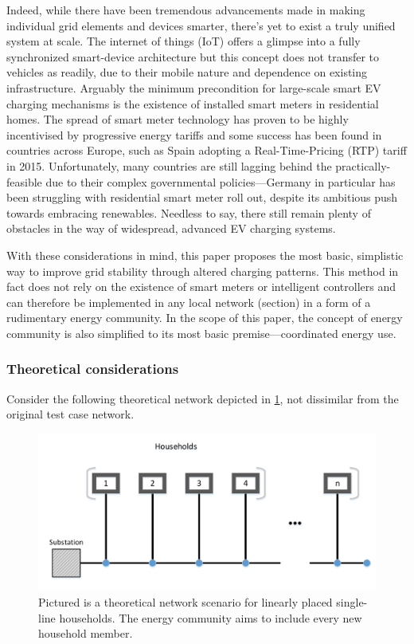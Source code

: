 \documentclass[a4paper,10pt]{report}
\begin{document}
Indeed, while there have been tremendous advancements made in making individual grid elements and devices smarter, there's yet to exist a truly unified system at scale. The internet of things (IoT) offers a glimpse into a fully synchronized smart-device architecture but this concept does not transfer to vehicles as readily, due to their mobile nature and dependence on existing infrastructure. Arguably the minimum precondition for large-scale smart EV charging mechanisms is the existence of installed smart meters in residential homes. The spread of smart meter technology has proven to be highly incentivised by progressive energy tariffs and some success has been found in countries across Europe, such as Spain adopting a Real-Time-Pricing (RTP) tariff in 2015. Unfortunately, many countries are still lagging behind the practically-feasible due to their complex governmental policies---Germany in particular has been struggling with residential smart meter roll out, despite its ambitious push towards embracing renewables. Needless to say, there still remain plenty of obstacles in the way of widespread, advanced EV charging systems.

With these considerations in mind, this paper proposes the most basic, simplistic way to improve grid stability through altered charging patterns. This method in fact does not rely on the existence of smart meters or intelligent controllers and can therefore be implemented in any local network (section) in a form of a rudimentary energy community. In the scope of this paper, the concept of energy community is also simplified to its most basic premise---coordinated energy use.

\subsubsection{Theoretical considerations}

Consider the following theoretical network depicted in \cref{comm_topology}, not dissimilar from the original test case network.

\begin{figure}[htpb]
	\centering
	\includegraphics[width=0.7\linewidth]{comm_topology}
	\caption{Pictured is a theoretical network scenario for linearly placed single-line households. The energy community aims to include every new household member.}
	\label{comm_topology}
\end{figure}
\end{document}
